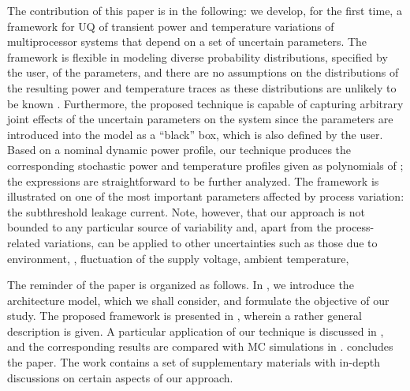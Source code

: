 The contribution of this paper is in the following: we develop, for the first time, a framework for UQ of transient power and temperature variations of multiprocessor systems that depend on a set of uncertain parameters. The framework is flexible in modeling diverse probability distributions, specified by the user, of the parameters, and there are no assumptions on the distributions of the resulting power and temperature traces as these distributions are unlikely to be known \apriori. Furthermore, the proposed technique is capable of capturing arbitrary joint effects of the uncertain parameters on the system since the parameters are introduced into the model as a ``black'' box, which is also defined by the user. Based on a nominal dynamic power profile, our technique produces the corresponding stochastic power and temperature profiles given as polynomials of \rvs; the expressions are straightforward to be further analyzed. The framework is illustrated on one of the most important parameters affected by process variation: the subthreshold leakage current. Note, however, that our approach is not bounded to any particular source of variability and, apart from the process-related variations, can be applied to other uncertainties such as those due to environment, \ie, fluctuation of the supply voltage, ambient temperature, \etc


The reminder of the paper is organized as follows. In , we introduce the architecture model, which we shall consider, and formulate the objective of our study. The proposed framework is presented in , wherein a rather general description is given. A particular application of our technique is discussed in , and the corresponding results are compared with MC simulations in .  concludes the paper. The work contains a set of supplementary materials with in-depth discussions on certain aspects of our approach.

